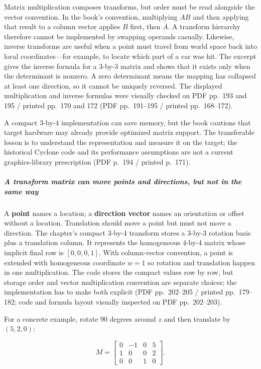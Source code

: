 Matrix multiplication composes transforms, but order must be read alongside the vector convention. In the book's convention, multiplying \(A B\) and then applying that result to a column vector applies \(B\) first, then \(A\). A transform hierarchy therefore cannot be implemented by swapping operands casually. Likewise, inverse transforms are useful when a point must travel from world space back into local coordinates---for example, to locate which part of a car was hit. The excerpt gives the inverse formula for a 3-by-3 matrix and shows that it exists only when the determinant is nonzero. A zero determinant means the mapping has collapsed at least one direction, so it cannot be uniquely reversed. The displayed multiplication and inverse formulas were visually checked on PDF pp.~193 and 195 / printed pp.~170 and 172 (PDF pp.~191--195 / printed pp.~168--172).

A compact 3-by-4 implementation can save memory, but the book cautions that target hardware may already provide optimized matrix support. The transferable lesson is to understand the representation and measure it on the target; the historical Cyclone code and its performance assumptions are not a current graphics-library prescription (PDF p.~194 / printed p.~171).

\subparagraph{A transform matrix can move points and directions, but not in the same way}\label{a-transform-matrix-can-move-points-and-directions-but-not-in-the-same-way}

A \textbf{point} names a location; a \textbf{direction vector} names an orientation or offset without a location. Translation should move a point but must not move a direction. The chapter's compact 3-by-4 transform stores a 3-by-3 rotation basis plus a translation column. It represents the homogeneous 4-by-4 matrix whose implicit final row is \([0,0,0,1]\). With column-vector convention, a point is extended with homogeneous coordinate \(w=1\) so rotation and translation happen in one multiplication. The code stores the compact values row by row, but storage order and vector multiplication convention are separate choices; the implementation has to make both explicit (PDF pp.~202--205 / printed pp.~179--182; code and formula layout visually inspected on PDF pp.~202--203).

For a concrete example, rotate 90 degrees around \(z\) and then translate by \((5,2,0)\):

\[
M = \begin{bmatrix}0&-1&0&5\\1&0&0&2\\0&0&1&0\end{bmatrix}.
\]

